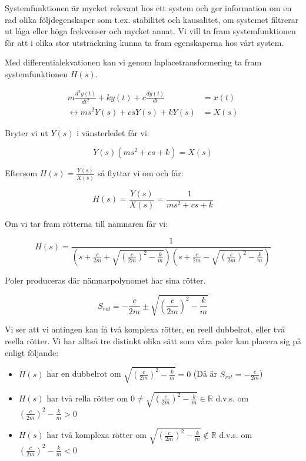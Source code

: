 \documentclass[10pt,a4paper]{article}
\begin{document}
Systemfunktionen är mycket relevant hos ett system och ger information om en rad olika följdegenskaper som t.ex. stabilitet och kausalitet, om systemet filtrerar ut låga eller höga frekvenser och mycket annat. Vi vill ta fram systemfunktionen för att i olika stor utsträckning kunna ta fram egenskaperna hos vårt system.

Med differentialekvationen kan vi genom laplacetransformering ta fram systemfunktionen $H(s)$.

\begin{equation}
\begin{split}
 m\frac{d^2y(t)}{dt^2} + k  y(t) + c\frac{dy(t)}{dt} & = x(t) \\ \leftrightarrow m  s^2  Y(s) + c  s  Y(s) + k  Y(s) & = X(s)
\end{split}
\end{equation}

Bryter vi ut $Y(s)$ i vänsterledet får vi:

\begin{equation}
Y(s)(m  s^2 + c  s + k) = X(s)
\end{equation}

Eftersom $H(s) = \frac{Y(s)}{X(s)}$ så flyttar vi om och får:

\begin{equation}
H(s) = \frac{Y(s)}{X(s)} = \frac{1}{m s^2 + c  s + k}
\end{equation}

Om vi tar fram rötterna till nämnaren får vi:

\begin{equation}
H(s)= \frac{1}{(s + \frac{c}{2 m} + \sqrt{ (\frac{c}{2  m})^2 - \frac{k}{m}}) (s + \frac{c}{2  m} - \sqrt{ (\frac{c}{2  m})^2 - \frac{k}{m}})}
\end{equation}

Poler produceras där nämnarpolynomet har sina rötter.

\begin{equation}
S_{rot}=-\frac{c}{2m} \pm \sqrt{(\frac{c}{2m})^2-\frac{k}{m}}
\end{equation}

Vi ser att vi antingen kan få två komplexa rötter, en reell dubbelrot, eller två reella rötter. Vi har alltså tre distinkt olika sätt som våra poler kan placera sig på enligt följande:
\begin{itemize}

\item $H(s)$ har en dubbelrot om $\sqrt{(\frac{c}{2m})^2-\frac{k}{m}}=0$ (Då är $S_{rot}=-\frac{c}{2m}$)


\item $H(s)$ har två rella rötter om $0\neq\sqrt{(\frac{c}{2m})^2-\frac{k}{m}}\in \mathbb{R}$ \newline d.v.s. om $(\frac{c}{2m})^2-\frac{k}{m}>0$


\item $H(s)$ har två komplexa rötter om $\sqrt{(\frac{c}{2m})^2-\frac{k}{m}}\notin \mathbb{R}$ \newline d.v.s. om $(\frac{c}{2m})^2-\frac{k}{m}<0$

\end{itemize}
\end{document}
